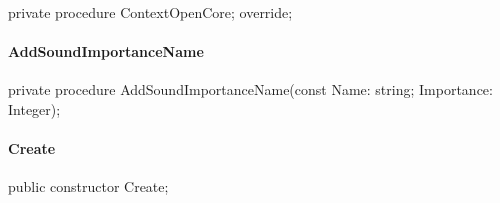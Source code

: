 \documentclass{report}
\newif\ifpdf
\begin{document}
\label{ok_nested_1.TRepoSoundEngine-ContextOpenCore}
\begin{list}{}{
\setlength{\itemindent}{0cm}
\setlength{\listparindent}{0cm}
\setlength{\leftmargin}{\evensidemargin}
\addtolength{\leftmargin}{\tmplength}
\settowidth{\labelsep}{X}
\addtolength{\leftmargin}{\labelsep}
\setlength{\labelwidth}{\tmplength}
}
\item[\textbf{Declaration}\hfill]
\ifpdf
\begin{flushleft}
\fi
\begin{ttfamily}
private procedure ContextOpenCore; override;\end{ttfamily}

\ifpdf
\end{flushleft}
\fi

\end{list}
\paragraph*{AddSoundImportanceName}\hspace*{\fill}

\label{ok_nested_1.TRepoSoundEngine-AddSoundImportanceName}
\begin{list}{}{
\setlength{\itemindent}{0cm}
\setlength{\listparindent}{0cm}
\setlength{\leftmargin}{\evensidemargin}
\addtolength{\leftmargin}{\tmplength}
\settowidth{\labelsep}{X}
\addtolength{\leftmargin}{\labelsep}
\setlength{\labelwidth}{\tmplength}
}
\item[\textbf{Declaration}\hfill]
\ifpdf
\begin{flushleft}
\fi
\begin{ttfamily}
private procedure AddSoundImportanceName(const Name: string; Importance: Integer);\end{ttfamily}

\ifpdf
\end{flushleft}
\fi

\end{list}
\paragraph*{Create}\hspace*{\fill}

\label{ok_nested_1.TRepoSoundEngine-Create}
\begin{list}{}{
\setlength{\itemindent}{0cm}
\setlength{\listparindent}{0cm}
\setlength{\leftmargin}{\evensidemargin}
\addtolength{\leftmargin}{\tmplength}
\settowidth{\labelsep}{X}
\addtolength{\leftmargin}{\labelsep}
\setlength{\labelwidth}{\tmplength}
}
\item[\textbf{Declaration}\hfill]
\ifpdf
\begin{flushleft}
\fi
\begin{ttfamily}
public constructor Create;\end{ttfamily}

\ifpdf
\end{flushleft}
\fi

\end{list}
\end{document}
